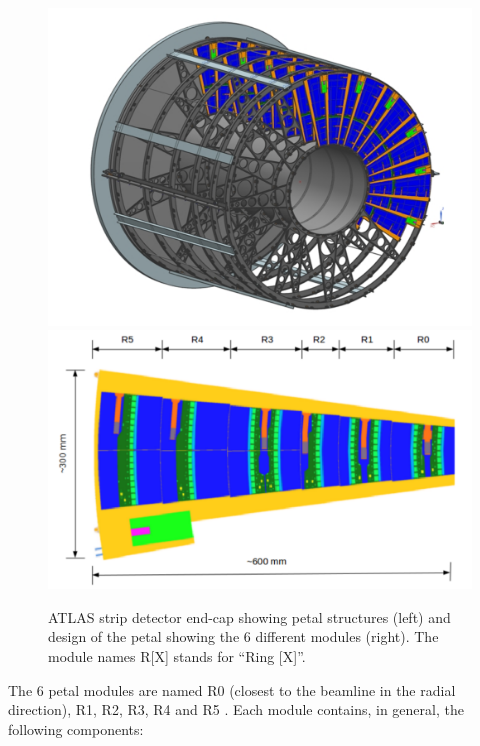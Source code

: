 		\begin{figure}[ht!]
			\centering
			\captionsetup{justification=centering,margin=2cm}
			\includegraphics[scale=0.25]{Figures/Chapter02/EndCap.pdf}
			\includegraphics[scale=0.26]{Figures/Chapter02/PetalDesign.pdf}
			\caption{ATLAS strip detector end-cap showing petal structures (left) and  design of the petal showing the 6 different modules (right). The module names R[X] stands for “Ring [X]”.}\label{fig2.1}
		\end{figure}
		
		The 6 petal modules are named R0 (closest to the beamline in the radial direction), R1, R2, R3, R4 and R5 . Each module contains, in general, the following components:
		
